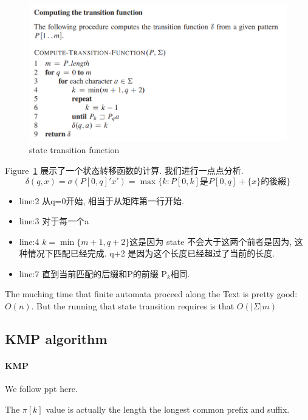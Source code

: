\documentclass[a4paper, 10pt]{ctexart} %
\begin{document}
\begin{figure}[]
    \centering
    \includegraphics[scale = 0.5]{sm1.png}
    \caption{state transition function}
    \label{fig:sm1}
\end{figure} 
Figure~\ref{fig:sm1} 展示了一个状态转移函数的计算. 我们进行一点点分析.
$$ \delta (q, x)  =\sigma (P [0,q] ' x' )  = \max \{ k : P[0,k] \text{是} P[0,q] + \{x\} \text{的後綴}\} $$
\begin{itemize}
    \item 
line:2 从q=0开始, 相当于从矩阵第一行开始. 
    \item 
line:3 对于每一个a
    \item
line:4 $ k=\min\{m+1,q+2\} $这是因为 state 不会大于这两个前者是因为, 这种情况下匹配已经完成. q+2 是因为这个长度已经超过了当前的长度. 
    \item
line:7 直到当前匹配的后缀和P的前缀 P$_{k}$相同. 
\end{itemize}
The muching time that finite automata proceed along the Text is 
pretty good: $O \left(n\right)$. 
But the running that state transition requires is that 
$O\left( \left| \Sigma \right| m\right)$

\subsection{KMP algorithm}
\paragraph{KMP} %
\label{par:KMP}
We follow ppt here.

The $\pi\left[ k \right]$ value is 
actually 
the length the longest common
prefix and suffix.
\end{document}
